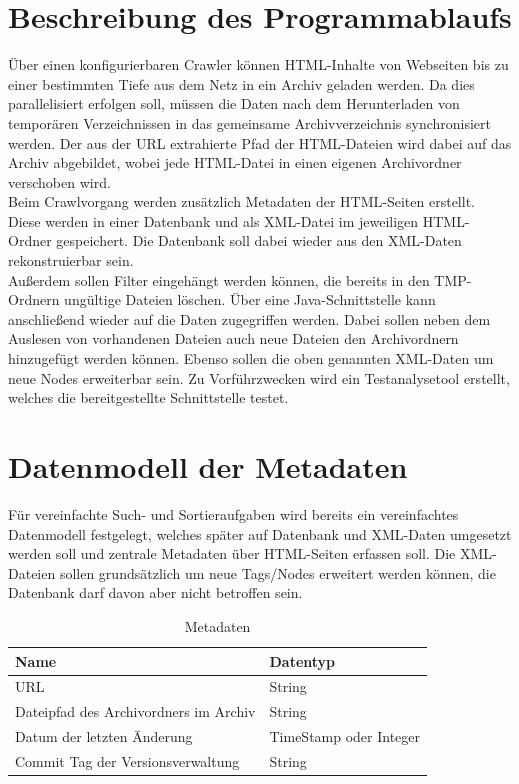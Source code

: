 \chapter{Beschreibung des Programmablaufs}
Über einen konfigurierbaren Crawler können HTML-Inhalte von Webseiten bis zu einer bestimmten Tiefe
aus dem Netz in ein Archiv geladen werden. Da dies parallelisiert erfolgen soll,
müssen die Daten nach dem Herunterladen von temporären Verzeichnissen in das gemeinsame
Archivverzeichnis synchronisiert werden. Der aus der URL extrahierte Pfad der HTML-Dateien wird
dabei auf das Archiv abgebildet, wobei jede HTML-Datei in einen eigenen Archivordner verschoben wird. \\
Beim Crawlvorgang werden zusätzlich Metadaten der HTML-Seiten erstellt. 
Diese werden in einer Datenbank und als XML-Datei im jeweiligen HTML-Ordner gespeichert.
Die Datenbank soll dabei wieder aus den XML-Daten rekonstruierbar sein. \\
Außerdem sollen Filter eingehängt werden können, die bereits in den TMP-Ordnern ungültige Dateien löschen.
Über eine Java-Schnittstelle kann anschließend wieder auf die Daten zugegriffen werden.
Dabei sollen neben dem Auslesen von vorhandenen Dateien auch neue Dateien den Archivordnern hinzugefügt werden können.
Ebenso sollen die oben genannten XML-Daten um neue Nodes erweiterbar sein.
Zu Vorführzwecken wird ein Testanalysetool erstellt, welches die bereitgestellte Schnittstelle testet.

\chapter{Datenmodell der Metadaten}
Für vereinfachte Such- und Sortieraufgaben wird bereits ein vereinfachtes Datenmodell festgelegt, welches
später auf Datenbank und XML-Daten umgesetzt werden soll und zentrale Metadaten über HTML-Seiten erfassen soll.
Die XML-Dateien sollen grundsätzlich um neue Tags/Nodes erweitert werden können, die Datenbank darf davon aber nicht betroffen sein.
\begin{table}[h]
\centering
\begin{tabular}{|l|l|}	
	\hline
	Name & Datentyp \\
	\hline
	URL & String \\
	Dateipfad des Archivordners im Archiv & String \\
	Datum der letzten Änderung & TimeStamp oder Integer \\
	Commit Tag der Versionsverwaltung & String \\
	\hline
\end{tabular}
\caption{Metadaten}
\end{table}

